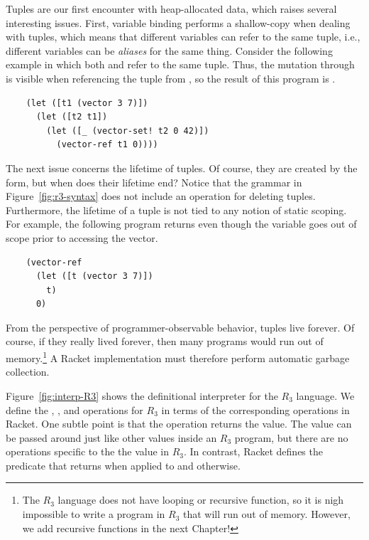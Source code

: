 \documentclass[11pt]{book}
\begin{document}
Tuples are our first encounter with heap-allocated data, which raises
several interesting issues. First, variable binding performs a
shallow-copy when dealing with tuples, which means that different
variables can refer to the same tuple, i.e., different variables can
be \emph{aliases} for the same thing. Consider the following example
in which both  and  refer to the same tuple.  Thus,
the mutation through  is visible when referencing the tuple
from , so the result of this program is .
\begin{lstlisting}
    (let ([t1 (vector 3 7)])
      (let ([t2 t1])
        (let ([_ (vector-set! t2 0 42)])
          (vector-ref t1 0))))
\end{lstlisting}

The next issue concerns the lifetime of tuples. Of course, they are
created by the  form, but when does their lifetime end?
Notice that the grammar in Figure~\ref{fig:r3-syntax} does not include
an operation for deleting tuples. Furthermore, the lifetime of a tuple
is not tied to any notion of static scoping. For example, the
following program returns  even though the variable 
goes out of scope prior to accessing the vector.
\begin{lstlisting}
    (vector-ref
      (let ([t (vector 3 7)])
        t)
      0)
\end{lstlisting}
From the perspective of programmer-observable behavior, tuples live
forever. Of course, if they really lived forever, then many programs
would run out of memory.\footnote{The $R_3$ language does not have
  looping or recursive function, so it is nigh impossible to write a
  program in $R_3$ that will run out of memory. However, we add
  recursive functions in the next Chapter!} A Racket implementation
must therefore perform automatic garbage collection.

Figure~\ref{fig:interp-R3} shows the definitional interpreter for the
$R_3$ language. We define the , , and
 operations for $R_3$ in terms of the corresponding
operations in Racket. One subtle point is that the 
operation returns the  value. The  value
can be passed around just like other values inside an $R_3$ program,
but there are no operations specific to the the  value
in $R_3$. In contrast, Racket defines the  predicate that
returns  when applied to  and 
otherwise.
\end{document}
